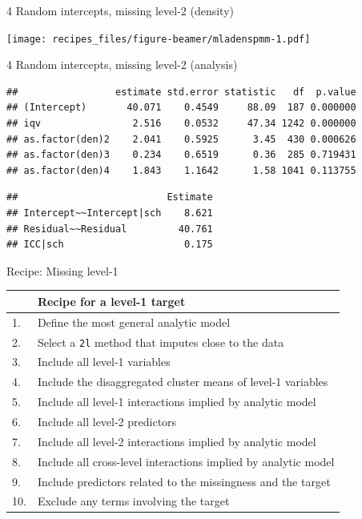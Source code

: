 \documentclass[ignorenonframetext,aspectratio=43]{beamer}
\begin{document}
\begin{frame}{4 Random intercepts, missing level-2 (density)}

\texttt{[image: recipes\_files/figure-beamer/mladenspmm-1.pdf]}

\end{frame}

\begin{frame}[fragile]{4 Random intercepts, missing level-2 (analysis)}

\begin{verbatim}
##                 estimate std.error statistic   df  p.value
## (Intercept)       40.071    0.4549     88.09  187 0.000000
## iqv                2.516    0.0532     47.34 1242 0.000000
## as.factor(den)2    2.041    0.5925      3.45  430 0.000626
## as.factor(den)3    0.234    0.6519      0.36  285 0.719431
## as.factor(den)4    1.843    1.1642      1.58 1041 0.113755
\end{verbatim}

\begin{verbatim}
##                          Estimate
## Intercept~~Intercept|sch    8.621
## Residual~~Residual         40.761
## ICC|sch                     0.175
\end{verbatim}

\end{frame}

\begin{frame}[fragile]{Recipe: Missing level-1}

\begin{longtable}[]{@{}ll@{}}
\toprule
& Recipe for a level-1 target\tabularnewline
\midrule
\endhead
1. & Define the most general analytic model\tabularnewline
2. & Select a \texttt{2l} method that imputes close to the
data\tabularnewline
3. & Include all level-1 variables\tabularnewline
4. & Include the disaggregated cluster means of level-1
variables\tabularnewline
5. & Include all level-1 interactions implied by analytic
model\tabularnewline
6. & Include all level-2 predictors\tabularnewline
7. & Include all level-2 interactions implied by analytic
model\tabularnewline
8. & Include all cross-level interactions implied by analytic
model\tabularnewline
9. & Include predictors related to the missingness and the
target\tabularnewline
10. & Exclude any terms involving the target\tabularnewline
\bottomrule
\end{longtable}

\end{frame}
\end{document}
